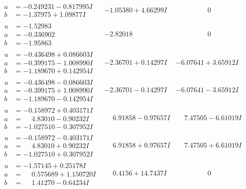 \documentclass[1p]{elsarticle_modified}
\theoremstyle{definition}
\begin{document}
$$\begin{array}{c|c|c}
\begin{aligned}
a &= -0.249231 - 0.817995 I \\
b &= -1.37975 + 1.09877 I\end{aligned}
 & -1.05380 + 4.66299 I & \phantom{-0.000000 } 0 \\ \hline\begin{aligned}
u &= -1.52983\phantom{ +0.000000I} \\
a &= -0.336902\phantom{ +0.000000I} \\
b &= -1.95863\phantom{ +0.000000I}\end{aligned}
 & -2.82018\phantom{ +0.000000I} & \phantom{-0.000000 } 0 \\ \hline\begin{aligned}
u &= -0.436498 + 0.086603 I \\
a &= -0.399175 - 1.008990 I \\
b &= -1.189670 + 0.142954 I\end{aligned}
 & -2.36701 + 0.14297 I & -6.07641 + 3.65912 I \\ \hline\begin{aligned}
u &= -0.436498 - 0.086603 I \\
a &= -0.399175 + 1.008990 I \\
b &= -1.189670 - 0.142954 I\end{aligned}
 & -2.36701 - 0.14297 I & -6.07641 - 3.65912 I \\ \hline\begin{aligned}
u &= -0.158972 + 0.403171 I \\
a &= \phantom{-}4.83010 - 0.90232 I \\
b &= -1.027510 - 0.307952 I\end{aligned}
 & \phantom{-}6.91858 - 0.97657 I & \phantom{-}7.47505 - 6.61019 I \\ \hline\begin{aligned}
u &= -0.158972 - 0.403171 I \\
a &= \phantom{-}4.83010 + 0.90232 I \\
b &= -1.027510 + 0.307952 I\end{aligned}
 & \phantom{-}6.91858 + 0.97657 I & \phantom{-}7.47505 + 6.61019 I \\ \hline\begin{aligned}
u &= -1.57145 + 0.25178 I \\
a &= \phantom{-}0.575689 + 1.150720 I \\
b &= \phantom{-}1.41270 - 0.64234 I\end{aligned}
 & \phantom{-}0.4156 + 14.7437 I & \phantom{-0.000000 } 0\\

\end{array}$$
\end{document}
